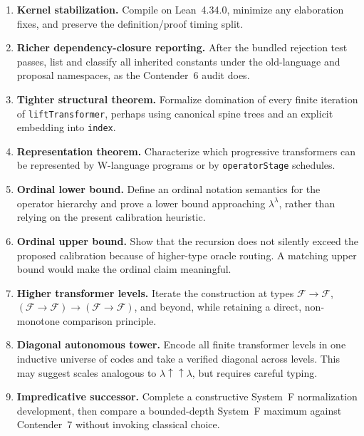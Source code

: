 \documentclass[11pt]{article}
\theoremstyle{definition}
\theoremstyle{remark}
\newcommand{\Fam}{\mathcal{F}}
\newcommand{\lean}[1]{\texttt{#1}}
\begin{document}
\begin{enumerate}[leftmargin=*]
  \item \textbf{Kernel stabilization.}  Compile on Lean~4.34.0, minimize any
        elaboration fixes, and preserve the definition/proof timing split.

  \item \textbf{Richer dependency-closure reporting.}  After the bundled
        rejection test passes, list and classify all inherited constants under
        the old-language and proposal namespaces, as the Contender~6 audit does.

  \item \textbf{Tighter structural theorem.}  Formalize domination of every
        finite iteration of \lean{liftTransformer}, perhaps using canonical
        spine trees and an explicit embedding into \lean{index}.

  \item \textbf{Representation theorem.}  Characterize which progressive
        transformers can be represented by W-language programs or by
        \lean{operatorStage} schedules.

  \item \textbf{Ordinal lower bound.}  Define an ordinal notation semantics for
        the operator hierarchy and prove a lower bound approaching
        \(\lambda^\lambda\), rather than relying on the present calibration
        heuristic.

  \item \textbf{Ordinal upper bound.}  Show that the recursion does not silently
        exceed the proposed calibration because of higher-type oracle routing.
        A matching upper bound would make the ordinal claim meaningful.

  \item \textbf{Higher transformer levels.}  Iterate the construction at types
        \(\Fam\to\Fam\), \((\Fam\to\Fam)\to(\Fam\to\Fam)\), and beyond, while
        retaining a direct, non-monotone comparison principle.

  \item \textbf{Diagonal autonomous tower.}  Encode all finite transformer
        levels in one inductive universe of codes and take a verified diagonal
        across levels.  This may suggest scales analogous to
        \(\lambda\uparrow\uparrow\lambda\), but requires careful typing.

  \item \textbf{Impredicative successor.}  Complete a constructive System~F
        normalization development, then compare a bounded-depth System~F
        maximum against Contender~7 without invoking classical choice.


\end{enumerate}
\end{document}
